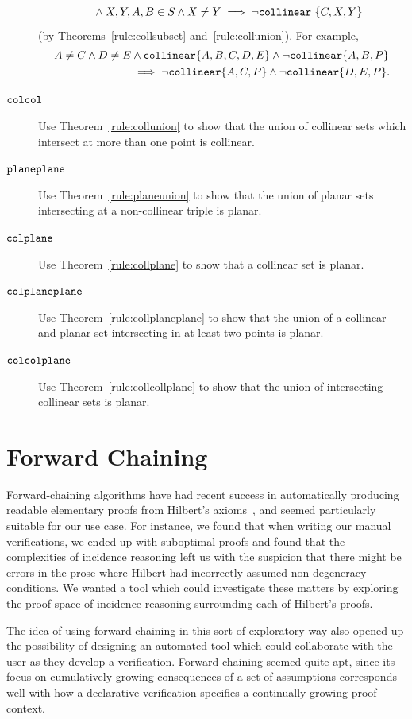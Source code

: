 \begin{description}
\begin{align*}
  &\qquad\wedge X,Y,A,B \in S \wedge X \neq Y\implies \neg\texttt{collinear}\ \{C,X,Y\}
\end{align*} (by Theorems~\ref{rule:collsubset} and~\ref{rule:collunion}). For example,
\begin{align*}
A \neq C \wedge D \neq E &\wedge \texttt{collinear} \{A, B, C, D, E\} \wedge \neg\texttt{collinear} \{A, B, P\}\\
&\implies \neg\texttt{collinear} \{A, C, P\} \wedge \neg\texttt{collinear} \{D, E, P\}.
\end{align*}
\item[$\texttt{colcol}$] Use Theorem~\ref{rule:collunion} to show that the union of collinear sets which intersect at more than one point is collinear.
\item[$\texttt{planeplane}$] Use Theorem~\ref{rule:planeunion} to show that the union of planar sets intersecting at a non-collinear triple is planar.
\item[$\texttt{colplane}$] Use Theorem~\ref{rule:collplane} to show that a collinear set is planar.
\item[$\texttt{colplaneplane}$] Use Theorem~\ref{rule:collplaneplane} to show that the union of a collinear and planar set intersecting in at least two points is planar.
\item[$\texttt{colcolplane}$] Use Theorem~\ref{rule:collcollplane} to show that the union of intersecting collinear sets is planar.
\end{description}

\section{Forward Chaining}\label{sec:ForwardChaining}
Forward-chaining algorithms have had recent success in automatically producing readable elementary proofs from Hilbert's axioms~\cite{ForwardChainHilbert}, and seemed particularly suitable for our use case. For instance, we found that when writing our manual verifications, we ended up with suboptimal proofs and found that the complexities of incidence reasoning left us with the suspicion that there might be errors in the prose where Hilbert had incorrectly assumed non-degeneracy conditions. We wanted a tool which could investigate these matters by exploring the proof space of incidence reasoning surrounding each of Hilbert's proofs. 

The idea of using forward-chaining in this sort of exploratory way also opened up the possibility of designing an automated tool which could collaborate with the user as they develop a verification. Forward-chaining seemed quite apt, since its focus on cumulatively growing consequences of a set of assumptions corresponds well with how a declarative verification specifies a continually growing proof context. 

